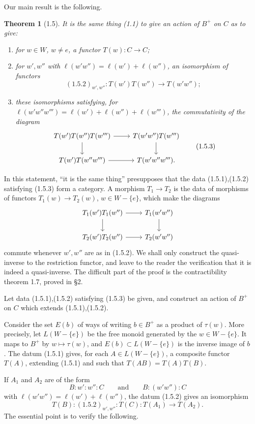\documentclass[11pt]{article}
\newtheorem{theorem}{Theorem}[section]
\begin{document}
Our main result is the following.

\begin{theorem}[1.5]
It is the same thing (1.1) to give an action of $B^+$ on $C$ as to give:
\begin{enumerate}[label=(1.5.\arabic*)]
\item for $w\in W$, $w\ne e$, a functor $T(w):C\to C$;
\item for $w',w''$ with $\ell(w'w'')=\ell(w')+\ell(w'')$, an isomorphism of functors
\[
 (1.5.2)_{w',w''}:T(w')T(w'')\longrightarrow T(w'w'');
\]
\item these isomorphisms satisfying, for $\ell(w'w''w''')=\ell(w')+\ell(w'')+\ell(w''')$, the commutativity of the diagram
\[
\begin{tikzcd}
 T(w')T(w'')T(w''') \arrow[r] \arrow[d] & T(w'w'')T(w''') \arrow[d]\\
 T(w')T(w''w''') \arrow[r] & T(w'w''w''') .
\end{tikzcd}
\tag{1.5.3}
\]
\end{enumerate}
\end{theorem}
In this statement, ``it is the same thing'' presupposes that the data (1.5.1),(1.5.2) satisfying (1.5.3) form a category. A morphism $T_1\to T_2$ is the data of morphisms of functors $T_1(w)\to T_2(w)$, $w\in W-\{e\}$, which make the diagrams
\[
\begin{tikzcd}
 T_1(w')T_1(w'') \arrow[r] \arrow[d] & T_1(w'w'') \arrow[d]\\
 T_2(w')T_2(w'') \arrow[r] & T_2(w'w'')
\end{tikzcd}
\]
commute whenever $w',w''$ are as in (1.5.2). We shall only construct the quasi-inverse to the restriction functor, and leave to the reader the verification that it is indeed a quasi-inverse. The difficult part of the proof is the contractibility theorem 1.7, proved in \S2.

Let data (1.5.1),(1.5.2) satisfying (1.5.3) be given, and construct an action of $B^+$ on $C$ which extends (1.5.1),(1.5.2).

Consider the set $E(b)$ of ways of writing $b\in B^+$ as a product of $\tau(w)$. More precisely, let $L(W-\{e\})$ be the free monoid generated by the $w\in W-\{e\}$. It maps to $B^+$ by $w\mapsto\tau(w)$, and $E(b)\subset L(W-\{e\})$ is the inverse image of $b$. The datum (1.5.1) gives, for each $A\in L(W-\{e\})$, a composite functor $T(A)$, extending (1.5.1) and such that $T(AB)=T(A)T(B)$.

If $A_1$ and $A_2$ are of the form
\begin{equation}
 B:w':w'':C\qquad\text{and}\qquad B:(w'w''):C
\tag{1.5.4}
\end{equation}
with $\ell(w'w'')=\ell(w')+\ell(w'')$, the datum (1.5.2) gives an isomorphism
\begin{equation}
 T(B):(1.5.2)_{w',w''}:T(C):T(A_1)\longrightarrow T(A_2).
\tag{1.5.5}
\end{equation}
The essential point is to verify the following.
\end{document}
